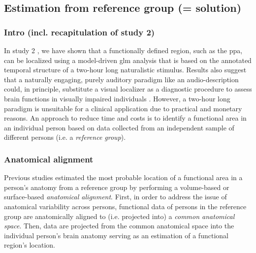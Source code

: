 \subsection{Estimation from reference group (= solution)}

\subsubsection{Intro (incl. recapitulation of study 2)}

In study 2 \citep{haeusler2022processing}, we have shown that a functionally
defined region, such as the \ac{ppa}, can be localized using a model-driven
\ac{glm} analysis that is based on the annotated temporal structure of a
two-hour long naturalistic stimulus.
Results also suggest that a naturally engaging, purely auditory paradigm like an
audio-description could, in principle, substitute a visual localizer as a
diagnostic procedure to assess brain functions in visually impaired individuals
\citep{haeusler2022processing}.
However, a two-hour long paradigm is unsuitable for a clinical application due
to practical and monetary reasons.
An approach to reduce time and costs is to identify a functional area in an
individual person based on data collected from an independent sample of
different persons (i.e. a \textit{reference group}).


\subsubsection{Anatomical alignment}

Previous studies estimated the most probable location of a functional area in a
person's anatomy from a reference group by performing a volume-based
\citep[e.g.,][]{zhen2017quantifying, zhen2015quantifying} or surface-based
\citep[e.g.,][]{frost2012measuring, weiner2018defining,
rosenke2021probabilistic, wang2015probabilistic} \textit{anatomical alignment}.
%
First, in order to address the issue of anatomical variability across persons,
functional data of persons in the reference group are anatomically aligned to
(i.e.  projected into) a \textit{common anatomical space}.
Then, data are projected from the common anatomical space into the individual
person's brain anatomy serving as an estimation of a functional region's
location.

